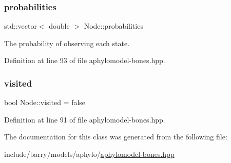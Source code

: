 \subsubsection{\texorpdfstring{probabilities}{probabilities}}
{\footnotesize\ttfamily std\+::vector$<$ double $>$ Node\+::probabilities}



The probability of observing each state. 



Definition at line 93 of file aphylomodel-\/bones.\+hpp.

\mbox{\label{class_node_aa1bdec4e775fc578632e6a2dced9e251}} 
\subsubsection{\texorpdfstring{visited}{visited}}
{\footnotesize\ttfamily bool Node\+::visited = false}



Definition at line 91 of file aphylomodel-\/bones.\+hpp.



The documentation for this class was generated from the following file\+:\begin{DoxyCompactItemize}
\item 
include/barry/models/aphylo/\hyperlink{aphylomodel-bones_8hpp}{aphylomodel-\/bones.\+hpp}\end{DoxyCompactItemize}
